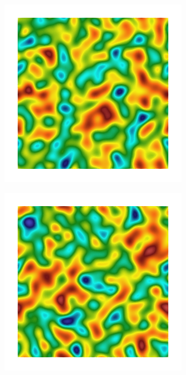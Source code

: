 \begin{figure}[!htb]
  \begin{subfigure}[b]{0.15\textwidth}
    \includegraphics[width=\textwidth]{Chapter4/figures/2D/Gc_sqexp_cartesian_5_5_rho_0_seed_e.png}
    \caption{}
    \label{fig: Chapter4/2D/Gc_sqexp_cartesian_5_5_rho_0_seed_e}
  \end{subfigure}
  \begin{subfigure}[b]{0.15\textwidth}
    \includegraphics[width=\textwidth]{Chapter4/figures/2D/psic_sqexp_cartesian_5_5_rho_0_seed_e.png}

\end{subfigure}
\end{figure}
